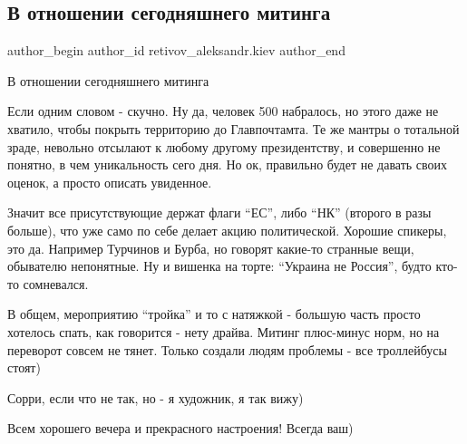  
 
 
 
 
 
\subsection{В отношении сегодняшнего митинга}
\label{sec:01_12_2021.fb.retivov_aleksandr.kiev.1.miting_skuchno}
 
\ifcmt
 author_begin
   author_id retivov_aleksandr.kiev
 author_end
\fi

В отношении сегодняшнего митинга

Если одним словом - скучно. Ну да, человек 500 набралось, но этого даже не
хватило, чтобы покрыть территорию до Главпочтамта. Те же мантры о тотальной
зраде, невольно отсылают к любому другому президентству, и совершенно не
понятно, в чем уникальность сего дня. Но ок, правильно будет не давать своих
оценок, а просто описать увиденное. 


Значит все присутствующие держат флаги \enquote{ЕС}, либо \enquote{НК} (второго в разы больше),
что уже само по себе делает акцию политической. Хорошие спикеры, это да.
Например Турчинов и Бурба, но говорят какие-то странные вещи, обывателю
непонятные. Ну и вишенка на торте: \enquote{Украина не Россия}, будто кто-то
сомневался. 


В общем, мероприятию \enquote{тройка} и то с натяжкой - большую часть просто хотелось
спать, как говорится - нету драйва. Митинг плюс-минус норм, но на переворот
совсем не тянет. Только создали людям проблемы - все троллейбусы стоят) 


Сорри, если что не так, но - я художник, я так вижу) 

Всем хорошего вечера и прекрасного настроения! Всегда ваш)

